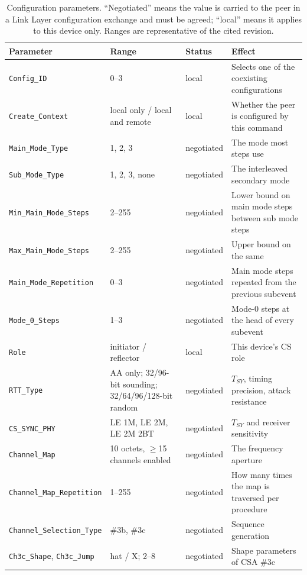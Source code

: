 \documentclass[11pt,a4paper]{article}
\newcommand{\code}[1]{\texttt{\small #1}}
\newcommand{\Tsy}{T_{SY}}
\begin{document}
\begin{table}[h]
\caption{Configuration parameters. ``Negotiated'' means the value is carried to the peer in a Link
Layer configuration exchange and must be agreed; ``local'' means it applies to this device only.
Ranges are representative of the cited revision.}
\label{tab:createcfg}
\centering\small
\begin{tabular}{@{}L{40mm}L{34mm}L{20mm}L{40mm}@{}}
\toprule
Parameter & Range & Status & Effect \\
\midrule
\code{Config\_ID} & 0--3 & local & Selects one of the coexisting configurations \\
\code{Create\_Context} & local only / local and remote & local & Whether the peer is configured by this command \\
\code{Main\_Mode\_Type} & 1, 2, 3 & negotiated & The mode most steps use \\
\code{Sub\_Mode\_Type} & 1, 2, 3, none & negotiated & The interleaved secondary mode \\
\code{Min\_Main\_Mode\_Steps} & 2--255 & negotiated & Lower bound on main mode steps between sub mode steps \\
\code{Max\_Main\_Mode\_Steps} & 2--255 & negotiated & Upper bound on the same \\
\code{Main\_Mode\_Repetition} & 0--3 & negotiated & Main mode steps repeated from the previous subevent \\
\code{Mode\_0\_Steps} & 1--3 & negotiated & Mode-0 steps at the head of every subevent \\
\code{Role} & initiator / reflector & local & This device's CS role \\
\code{RTT\_Type} & AA only; 32/96-bit sounding; 32/64/96/128-bit random & negotiated & $\Tsy$, timing precision, attack resistance \\
\code{CS\_SYNC\_PHY} & LE 1M, LE 2M, LE 2M 2BT & negotiated & $\Tsy$ and receiver sensitivity \\
\code{Channel\_Map} & 10 octets, $\ge$15 channels enabled & negotiated & The frequency aperture \\
\code{Channel\_Map\_Repetition} & 1--255 & negotiated & How many times the map is traversed per procedure \\
\code{Channel\_Selection\_Type} & \#3b, \#3c & negotiated & Sequence generation \\
\code{Ch3c\_Shape}, \code{Ch3c\_Jump} & hat / X; 2--8 & negotiated & Shape parameters of CSA \#3c \\
\bottomrule
\end{tabular}
\end{table}
\end{document}
